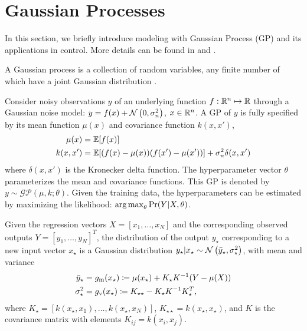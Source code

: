 \section{Gaussian Processes}
\label{S:gp}

In this section, we briefly introduce modeling with Gaussian Process (GP) and its applications in control.
More details can be found in \cite{Rasmussen2006} %
and \cite{Kocijan2016}. %

\begin{definition}
A Gaussian process is a collection of random variables, any finite number of which have a joint Gaussian distribution \cite{Rasmussen2006}.
\end{definition}
Consider noisy observations \(y\) of an underlying function \(f: \mathbb{R}^n \mapsto \mathbb{R}\) through a Gaussian noise model: \(y = f(x) + \operatorname*{\mathcal{N}}\left(0, \sigma_n^2\right)\), \(x \in \mathbb{R}^n\).
A GP of \(y\) is fully specified by its mean function \(\mu(x)\) and covariance function \(k(x,x')\),
\begin{align*}
\mu(x) &= \mathbb{E} [f(x)] \\
k(x,x') &= \mathbb{E} [(f(x)-\mu(x)) (f(x') - \mu(x'))] + \sigma_n^2 \delta(x,x')
\end{align*}
where \(\delta(x,x')\) is the Kronecker delta function.
The hyperparameter vector \(\theta\) parameterizes the mean and covariance functions.
This GP is denoted by \(y \sim \mathcal{GP}(\mu, k; \theta)\).
Given the training data, the hyperparameters can be estimated by maximizing the likelihood: \(\operatorname*{arg\,max}_\theta \Pr(Y \vert X, \theta)\).

Given the regression vectors \(X = [x_1, \dots, x_N]\) and the corresponding observed outputs \(Y = [y_1, \dots, y_N]^T\), the distribution of the output \(y_\star\) corresponding to a new input vector \(x_\star\) is a Gaussian distribution \(y_\star | x_\star \sim \operatorname*{\mathcal{N}}\left(\bar{y}_\star, \sigma_\star^2\right)\), with mean and variance
\begin{subequations}
\label{E:gp-regression}
\begin{align}
\bar{y}_\star &= g_{\mathrm{m}} (x_{\star}) \coloneqq \mu(x_\star) + K_\star K^{-1} (Y - \mu(X))\\
\sigma_\star^2 &= g_{\mathrm{v}} (x_{\star}) \coloneqq K_{\star \star} - K_\star K^{-1} K_\star^T \text,
\end{align}
\end{subequations}
where \(K_\star = [k(x_\star, x_1), \dots, k(x_\star, x_N)]\), \(K_{\star \star} = k(x_\star, x_\star)\), and $K$ is the covariance matrix with elements \(K_{ij} = k(x_i, x_j)\).

